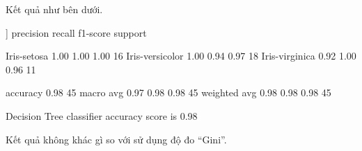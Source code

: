 Kết quả như bên dưới.

\begin{terminal}
[[16  0  0]
[ 0 17  1]
[ 0  0 11]]
                 precision    recall  f1-score   support

    Iris-setosa       1.00      1.00      1.00        16
Iris-versicolor       1.00      0.94      0.97        18
 Iris-virginica       0.92      1.00      0.96        11

       accuracy                           0.98        45
      macro avg       0.97      0.98      0.98        45
   weighted avg       0.98      0.98      0.98        45

Decision Tree classifier accuracy score is 0.98
\end{terminal}

Kết quả không khác gì so với sử dụng độ đo \enquote{Gini}.
